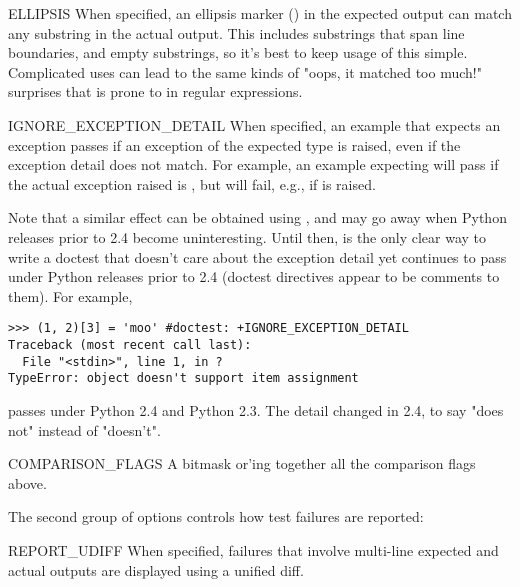 \begin{datadesc}{ELLIPSIS}
    When specified, an ellipsis marker () in the expected output
    can match any substring in the actual output.  This includes
    substrings that span line boundaries, and empty substrings, so it's
    best to keep usage of this simple.  Complicated uses can lead to the
    same kinds of "oops, it matched too much!" surprises that 
    is prone to in regular expressions.
\end{datadesc}

\begin{datadesc}{IGNORE_EXCEPTION_DETAIL}
    When specified, an example that expects an exception passes if
    an exception of the expected type is raised, even if the exception
    detail does not match.  For example, an example expecting
     will pass if the actual exception raised is
    , but will fail, e.g., if
     is raised.

    Note that a similar effect can be obtained using ,
    and  may go away when Python releases
    prior to 2.4 become uninteresting.  Until then,
     is the only clear way to write a
    doctest that doesn't care about the exception detail yet continues
    to pass under Python releases prior to 2.4 (doctest directives
    appear to be comments to them).  For example,

\begin{verbatim}
>>> (1, 2)[3] = 'moo' #doctest: +IGNORE_EXCEPTION_DETAIL
Traceback (most recent call last):
  File "<stdin>", line 1, in ?
TypeError: object doesn't support item assignment
\end{verbatim}

    passes under Python 2.4 and Python 2.3.  The detail changed in 2.4,
    to say "does not" instead of "doesn't".

\end{datadesc}

\begin{datadesc}{COMPARISON_FLAGS}
    A bitmask or'ing together all the comparison flags above.
\end{datadesc}

The second group of options controls how test failures are reported:

\begin{datadesc}{REPORT_UDIFF}
    When specified, failures that involve multi-line expected and
    actual outputs are displayed using a unified diff.
\end{datadesc}

